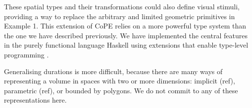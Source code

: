These spatial types and their transformations could also define visual
stimuli, providing a way to replace the arbitrary and limited
geometric primitives in Example 1. This extension of CoPE relies on a
more powerful type system than the one we have described
previously. We have implemented the central features in the purely
functional language Haskell using extensions that enable type-level
programming \citep{Kiselyov2010}.

Generalising durations is more difficult, because there are many ways
of representing a volume in spaces with two or more dimensions:
implicit (ref), parametric (ref), or bounded by polygons. We do not
commit to any of these representations here.

